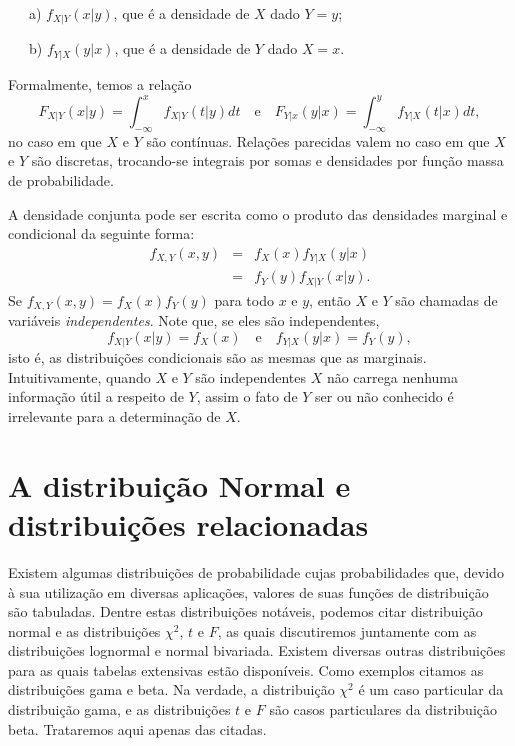 \documentclass[
]{book}
\theoremstyle{definition}
\theoremstyle{definition}
\theoremstyle{definition}
\theoremstyle{remark}
\begin{document}
~~~a) \(f_{X|Y}(x|y)\), que é a densidade de \(X\) dado \(Y=y\);

~~~b) \(f_{Y|X}(y|x)\), que é a densidade de \(Y\) dado \(X=x\).

Formalmente, temos a relação
\[F_{X|Y}(x|y)=\int_{-\infty}^xf_{X|Y}(t|y)dt\quad \mbox{e} \quad F_{Y|x}(y|x)=\int_{-\infty}^yf_{Y|X}(t|x)dt,\]
no caso em que \(X\) e \(Y\) são contínuas. Relações parecidas valem no caso em que \(X\) e \(Y\) são discretas, trocando-se integrais por somas e densidades por função massa de probabilidade.

A densidade conjunta pode ser escrita como o produto das
densidades marginal e condicional da seguinte forma:
\begin{eqnarray*}
f_{X,Y}(x,y)&=&f_X(x)f_{Y|X}(y|x)\\
      &=&f_Y(y)f_{X|Y}(x|y).
\end{eqnarray*}
Se \(f_{X,Y}(x,y)=f_X(x)f_Y(y)\) para todo \(x\) e \(y\), então \(X\) e \(Y\) são
chamadas de variáveis \emph{independentes}. Note que, se eles são
independentes,
\[f_{X|Y}(x|y)=f_X(x) \quad \mbox{e} \quad f_{Y|X}(y|x)=f_Y(y),\]
isto é, as distribuições condicionais são as mesmas que as marginais. Intuitivamente, quando \(X\) e \(Y\) são independentes \(X\) não carrega nenhuma informação útil a respeito de \(Y\), assim o fato de \(Y\) ser ou não conhecido é irrelevante para a determinação de \(X\).

\hypertarget{a-distribuiuxe7uxe3o-normal-e-distribuiuxe7uxf5es-relacionadas}{%
\section{A distribuição Normal e distribuições relacionadas}\label{a-distribuiuxe7uxe3o-normal-e-distribuiuxe7uxf5es-relacionadas}}

Existem algumas distribuições de probabilidade cujas probabilidades que, devido à sua utilização em diversas aplicações, valores de suas funções de distribuição são tabuladas. Dentre estas distribuições notáveis, podemos citar distribuição normal e as distribuições \(\chi^2\), \(t\) e \(F\), as quais discutiremos juntamente com as distribuições lognormal e normal bivariada. Existem diversas outras distribuições para as quais tabelas extensivas estão disponíveis. Como exemplos citamos as distribuições gama e beta. Na verdade, a distribuição \(\chi^2\) é um caso particular da distribuição gama, e as distribuições \(t\) e \(F\) são casos particulares da distribuição beta. Trataremos aqui apenas das citadas.
\end{document}
